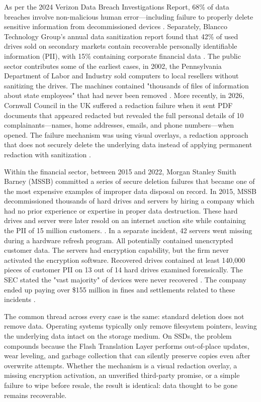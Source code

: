 As per the 2024 Verizon Data Breach Investigations Report, 68\% of data breaches involve 
non-malicious human error—including failure to properly delete sensitive information from 
decommissioned devices \cite{Verizon2024DBIR}. Separately, Blancco Technology Group's annual 
data sanitization report found that 42\% of used drives sold on secondary markets contain 
recoverable personally identifiable information (PII), with 15\% containing corporate financial 
data \cite{Blancco2026}. The public sector contributes some of the earliest cases, in 2002, the 
Pennsylvania Department of Labor and Industry sold computers to local resellers without 
sanitizing the drives. The machines contained "thousands of files of information about state 
employees" that had never been removed \cite{MITstudy2003}. More recently, in 2026, Cornwall 
Council in the UK suffered a redaction failure when it sent PDF documents that appeared redacted 
but revealed the full personal details of 10 complainants—names, home addresses, emails, and 
phone numbers—when opened. The failure mechanism was using visual overlays, a redaction approach
that does not securely delete the underlying data instead of applying permanent redaction with 
sanitization \cite{ComplianceHub2026}.

Within the financial sector, between 2015 and 2022, Morgan Stanley Smith Barney (MSSB) committed 
a series of secure deletion failures that became one of the most expensive examples of improper 
data disposal on record. In 2015, MSSB decommissioned thousands of hard drives and servers by hiring
a company which had no prior experience or expertise in proper data destruction. These hard drives
and server were later resold on an internet auction site while containing the PII of 15 million 
customers. \cite{Goodin2022}. In a separate incident, 42 servers went missing during a hardware 
refresh program. All potentially contained unencrypted customer data. The servers had encryption 
capability, but the firm never activated the encryption software. Recovered drives contained at 
least 140,000 pieces of customer PII on 13 out of 14 hard drives examined forensically. The SEC 
stated the "vast majority" of devices were never recovered \cite{SEC2022}. The company ended up 
paying over \$155 million in fines and settlements related to these incidents \cite{CybersecurityDive2022}. 

The common thread across every case is the same: standard deletion does not remove data. Operating 
systems typically only remove filesystem pointers, leaving the underlying data intact on the 
storage medium. On SSDs, the problem compounds because the Flash Translation Layer performs 
out-of-place updates, wear leveling, and garbage collection that can silently preserve copies 
even after overwrite attempts. Whether the mechanism is a visual redaction overlay, a missing 
encryption activation, an unverified third-party promise, or a simple failure to wipe before 
resale, the result is identical: data thought to be gone remains recoverable.

